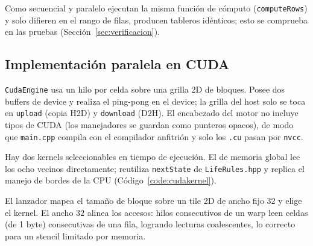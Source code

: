 \documentclass[
	spanish,
	letterpaper, oneside
]{article}
\begin{document}
Como secuencial y paralelo ejecutan la misma función de cómputo
(\texttt{computeRows}) y solo difieren en el rango de filas, producen tableros
idénticos; esto se comprueba en las pruebas (Sección~\ref{sec:verificacion}).

\subsection{Implementación paralela en CUDA}
\label{sec:impl-cuda}

\texttt{CudaEngine} usa un hilo por celda sobre una grilla 2D de bloques. Posee
dos buffers de device y realiza el ping-pong en el device; la
grilla del host solo se toca en \texttt{upload} (copia H2D) y
\texttt{download} (D2H). El encabezado del motor no incluye tipos de CUDA (los
manejadores se guardan como punteros opacos), de modo que \texttt{main.cpp}
compila con el compilador anfitrión y solo los \texttt{.cu} pasan por
\texttt{nvcc}.

Hay dos kernels seleccionables en tiempo de ejecución. El de memoria global lee
los ocho vecinos directamente; reutiliza \texttt{nextState} de
\texttt{LifeRules.hpp} y replica el manejo de bordes de la CPU
(Código~\ref{code:cudakernel}).


El lanzador mapea el tamaño de bloque sobre un tile 2D de ancho fijo $32$ y
elige el kernel. El ancho $32$ alinea los accesos: hilos consecutivos de un
warp leen celdas (de 1 byte) consecutivas de una fila, logrando lecturas
coalescentes, lo correcto para un stencil limitado por memoria.
\end{document}
